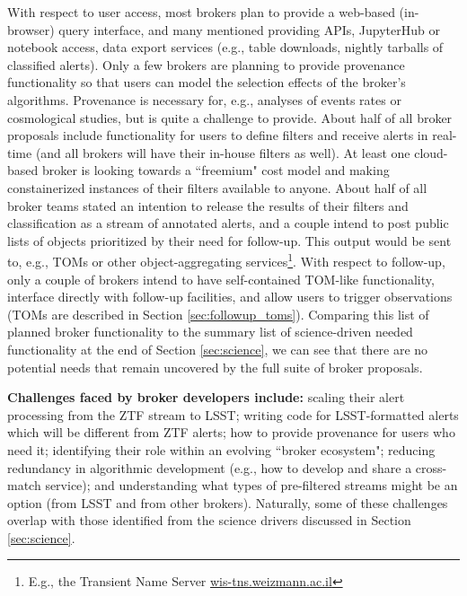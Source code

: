 With respect to user access, most brokers plan to provide a web-based (in-browser) query interface, and many mentioned providing APIs, JupyterHub or notebook access, data export services (e.g., table downloads, nightly tarballs of classified alerts).
Only a few brokers are planning to provide \gls{provenance} functionality so that users can model the selection effects of the broker's algorithms.
Provenance is necessary for, e.g., analyses of events rates or cosmological studies, but is quite a challenge to provide.
About half of all broker proposals include functionality for users to define filters and receive alerts in real-time (and all brokers will have their in-house filters as well).
At least one cloud-based broker is looking towards a ``freemium" cost model and making constainerized instances of their filters available to anyone. 
About half of all broker teams stated an intention to release the results of their filters and classification as a stream of annotated alerts, and a couple intend to post public lists of objects prioritized by their need for follow-up.
This output would be sent to, e.g., TOMs or other object-aggregating services\footnote{E.g., the Transient Name Server \url{wis-tns.weizmann.ac.il}}.
With respect to follow-up, only a couple of brokers intend to have self-contained \gls{TOM}-like functionality, interface directly with follow-up facilities, and allow users to trigger observations (TOMs are described in Section \ref{sec:followup_toms}).
Comparing this list of planned broker functionality to the summary list of science-driven needed functionality at the end of Section \ref{sec:science}, we can see that there are no potential needs that remain uncovered by the full suite of broker proposals.

{\bf Challenges faced by broker developers include:} scaling their alert processing from the \gls{ZTF} stream to \gls{LSST}; writing code for \gls{LSST}-formatted alerts which will be different from \gls{ZTF} alerts; how to provide \gls{provenance} for users who need it; identifying their role within an evolving ``broker ecosystem"; reducing redundancy in algorithmic development (e.g., how to develop and share a cross-match service); and understanding what types of pre-filtered streams might be an option (from \gls{LSST} and from other brokers).
Naturally, some of these challenges overlap with those identified from the science drivers discussed in Section \ref{sec:science}.


